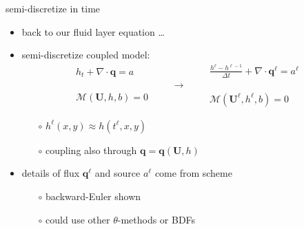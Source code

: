 \documentclass[xcolor={dvipsnames}]{beamer}
\newcommand\bq{\mathbf{q}}
\newcommand\bU{\mathbf{U}}
\newcommand\Div{\nabla\cdot}
\begin{document}
\newcommand{\singletsmc}{\frac{h^\ell - h^{\ell-1}}{\Delta t} + \Div \bq^\ell = a^\ell}


\begin{frame}{semi-discretize in time}

\begin{itemize}
\item back to our fluid layer equation \dots
\item semi-discretize coupled model:
$$\begin{matrix}
 h_t + \Div\bq = a \\
 \phantom{foo} \\
 \mathcal{M}(\bU,h,b) = 0
\end{matrix} \qquad \to \qquad \begin{matrix}
 \singletsmc \\
 \phantom{foo} \\
 \mathcal{M}(\bU^\ell,h^\ell,b) = 0
\end{matrix}$$
        \begin{itemize}
        \item[$\circ$] $h^\ell(x,y) \approx h(t^\ell,x,y)$
        \item[$\circ$] coupling also through $\bq=\bq(\bU,h)$
        \end{itemize}
\item details of flux $\bq^\ell$ and source $a^\ell$ come from scheme
        \begin{itemize}
        \item[$\circ$] backward-Euler shown
        \item[$\circ$] could use other $\theta$-methods or BDFs
        \end{itemize}
\end{itemize}
\end{frame}
\end{document}
